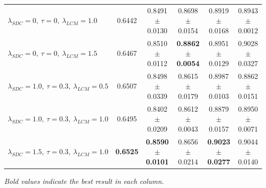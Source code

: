 \begin{table}[!htbp]
{\begin{tabular}{lccccc}
            $\lambda_{SDC}=0,\ \tau=0,\ \lambda_{LCM}=1.0$
            & 0.6442
            & 0.8491 $\pm$ 0.0130
            & 0.8698 $\pm$ 0.0154
            & 0.8919 $\pm$ 0.0168
            & 0.8943 $\pm$ 0.0012 \\

            $\lambda_{SDC}=0,\ \tau=0,\ \lambda_{LCM}=1.5$
            & 0.6467
            & 0.8510 $\pm$ 0.0112
            & \textbf{0.8862 $\pm$ 0.0054}
            & 0.8951 $\pm$ 0.0129
            & 0.9028 $\pm$ 0.0327 \\

            \midrule

            $\lambda_{SDC}=1.0,\ \tau=0.3,\ \lambda_{LCM}=0.5$
            & 0.6507
            & 0.8498 $\pm$ 0.0339
            & 0.8615 $\pm$ 0.0179
            & 0.8987 $\pm$ 0.0103
            & 0.8862 $\pm$ 0.0151 \\

            $\lambda_{SDC}=1.0,\ \tau=0.3,\ \lambda_{LCM}=1.0$
            & 0.6495
            & 0.8402 $\pm$ 0.0209
            & 0.8612 $\pm$ 0.0043
            & 0.8879 $\pm$ 0.0157
            & 0.8950 $\pm$ 0.0071 \\

            $\lambda_{SDC}=1.5,\ \tau=0.3,\ \lambda_{LCM}=1.0$
            & \textbf{0.6525}
            & \textbf{0.8590 $\pm$ 0.0101}
            & 0.8656 $\pm$ 0.0214
            & \textbf{0.9023 $\pm$ 0.0277}
            & 0.9044 $\pm$ 0.0140 \\

            \bottomrule[1.25pt]
        \end{tabular}
    }
    \vspace{2mm}
    
    \footnotesize{\textit{Bold values indicate the best result in each column.}}
\end{table}

